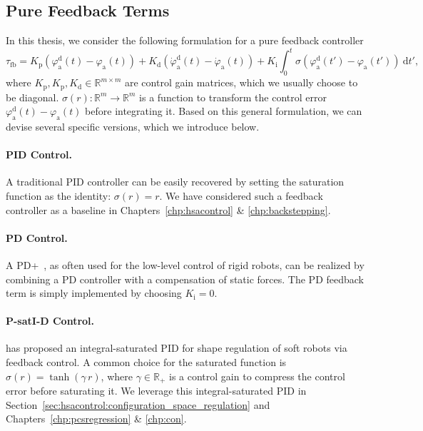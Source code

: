 \subsection{Pure Feedback Terms}\label{sub:background:model_based_control:feedback_terms}
In this thesis, we consider the following formulation for a pure feedback controller
\begin{equation}
    \tau_\mathrm{fb} = K_\mathrm{p} \left (\varphi_\mathrm{a}^\mathrm{d}(t) - \varphi_\mathrm{a}(t) \right ) + K_\mathrm{d} \left ( \dot{\varphi}_\mathrm{a}^\mathrm{d}(t) - \dot{\varphi}_\mathrm{a}(t) \right ) + K_\mathrm{i} \int_0^t \sigma \left ( \varphi_{\mathrm{a}}^\mathrm{d}(t')-\varphi_{\mathrm{a}}(t') \right ) \: \mathrm{d} t',
\end{equation}
where $K_\mathrm{p}, K_\mathrm{p}, K_\mathrm{d} \in \mathbb{R}^{m \times m}$ are control gain matrices, which we usually choose to be diagonal. $\sigma(r): \mathbb{R}^m \to \mathbb{R}^m$ is a function to transform the control error $\varphi_{\mathrm{a}}^\mathrm{d}(t)-\varphi_{\mathrm{a}}(t)$ before integrating it.
Based on this general formulation, we can devise several specific versions, which we introduce below.

\paragraph{PID Control.} A traditional PID controller can be easily recovered by setting the saturation function as the identity: $\sigma(r) = r$. We have considered such a feedback controller as a baseline in Chapters~\ref{chp:hsacontrol} \& \ref{chp:backstepping}.

\paragraph{PD Control.} A PD+~\citep{kelly1997pd}, as often used for the low-level control of rigid robots, can be realized by combining a PD controller with a compensation of static forces. The PD feedback term is simply implemented by choosing $K_\mathrm{i} = 0$.

\paragraph{P-satI-D Control.} \citet{pustina2022p} has proposed an integral-saturated PID for shape regulation of soft robots via feedback control. A common choice for the saturated function is $\sigma(r) = \tanh(\gamma \, r)$, where $\gamma \in \mathbb{R}_+$ is a control gain to compress the control error before saturating it. We leverage this integral-saturated PID in Section~\ref{sec:hsacontrol:configuration_space_regulation} and Chapters~\ref{chp:pcsregression} \& \ref{chp:con}.


